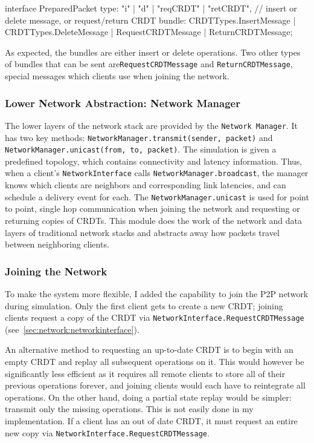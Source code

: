 \documentclass[12pt,a4paper,twoside,openright]{report}
\begin{document}
\begin{typescript}	[][]
interface PreparedPacket {
	type: "i" | "d" | "reqCRDT" | "retCRDT",    // insert or delete message, or request/return CRDT
	bundle: CRDTTypes.InsertMessage | CRDTTypes.DeleteMessage | RequestCRDTMessage | ReturnCRDTMessage;
}
\end{typescript}
		
		As expected, the bundles are either insert or delete operations. Two other types of bundles that can be sent are\texttt{RequestCRDTMessage} and \texttt{ReturnCRDTMessage}, special messages which clients use when joining the network.
		

		
		\subsubsection{Lower Network Abstraction: Network Manager}
		The lower layers of the network stack are provided by the \texttt{Network Manager}. It has two key methods: \texttt{NetworkManager.transmit(sender, packet)} and \texttt{NetworkManager.unicast(from, to, packet)}. The simulation is given a predefined topology, which contains connectivity and latency information. Thus, when a client's \texttt{NetworkInterface} calls \texttt{NetworkManager.broadcast}, the manager knows which clients are neighbors and corresponding link latencies, and can schedule a delivery event for each. The \texttt{NetworkManager.unicast} is used for point to point, single hop communication when joining the network and requesting or returning copies of CRDTs. This module does the work of the network and data layers of traditional network stacks and abstracts away how packets travel between neighboring clients.
		
		\subsubsection{Joining the Network} \label{sec:networkjoin}
		To make the system more flexible, I added the capability to join the P2P network during simulation. Only the first client gets to create a new CRDT; joining clients request a copy of the CRDT via \texttt{NetworkInterface.RequestCRDTMessage} (see~\cref{sec:network:networkinterface}).
		
		An alternative method to requesting an up-to-date CRDT is to begin with an empty CRDT and replay all subsequent operations on it. This would however be significantly less efficient as it requires all remote clients to store all of their previous operations forever, and joining clients would each have to reintegrate all operations. On the other hand, doing a partial state replay would be simpler: transmit only the missing operations. This is not easily done in my implementation. If a client has an out of date CRDT, it must request an entire new copy via \texttt{NetworkInterface.RequestCRDTMessage}.
		
\end{document}
